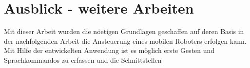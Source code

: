 \chapter{Ausblick - weitere Arbeiten}
\label{chap:Ausblick}

Mit dieser Arbeit wurden die n\"oetigen Grundlagen geschaffen auf deren Basis in der nachfolgenden Arbeit die Ansteuerung 
eines mobilen Roboters erfolgen kann. Mit Hilfe der entwickelten Anwendung ist es m\"oglich erste Gesten und Sprachkommandos zu erfassen und die Schnittstellen
